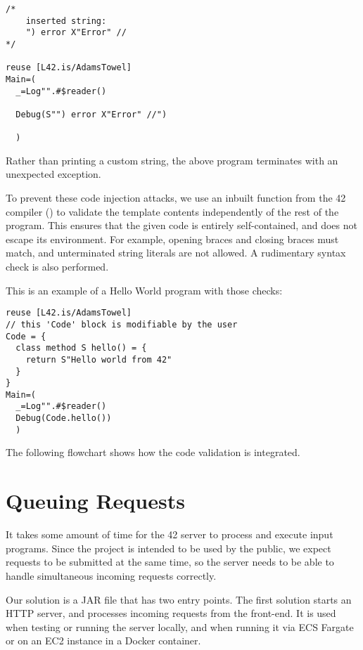 \begin{lstlisting}[caption=Code injection example]
/*
    inserted string:
    ") error X"Error" //
*/

reuse [L42.is/AdamsTowel]
Main=(
  _=Log"".#$reader()

  Debug(S"") error X"Error" //")
  
  )
\end{lstlisting}

Rather than printing a custom string, the above program terminates with an unexpected exception.

To prevent these code injection attacks, we use an inbuilt function from the 42 compiler () to validate the template contents independently of the rest of the program. This ensures that the given code is entirely self-contained, and does not escape its environment. For example, opening braces and closing braces must match, and unterminated string literals are not allowed. A rudimentary syntax check is also performed.

This is an example of a Hello World program with those checks:

\begin{lstlisting}[caption=Templated Hello World program]
reuse [L42.is/AdamsTowel]
// this 'Code' block is modifiable by the user
Code = {
  class method S hello() = {
    return S"Hello world from 42"
  }
}
Main=(
  _=Log"".#$reader()
  Debug(Code.hello())
  )
\end{lstlisting}

The following flowchart shows how the code validation is integrated.


\section{Queuing Requests}

It takes some amount of time for the 42 server to process and execute input programs. Since the project is intended to be used by the public, we expect requests to be submitted at the same time, so the server needs to be able to handle simultaneous incoming requests correctly.

Our solution is a JAR file that has two entry points. The first solution starts an HTTP server, and processes incoming requests from the front-end. It is used when testing or running the server locally, and when running it via ECS Fargate or on an EC2 instance in a Docker container.

